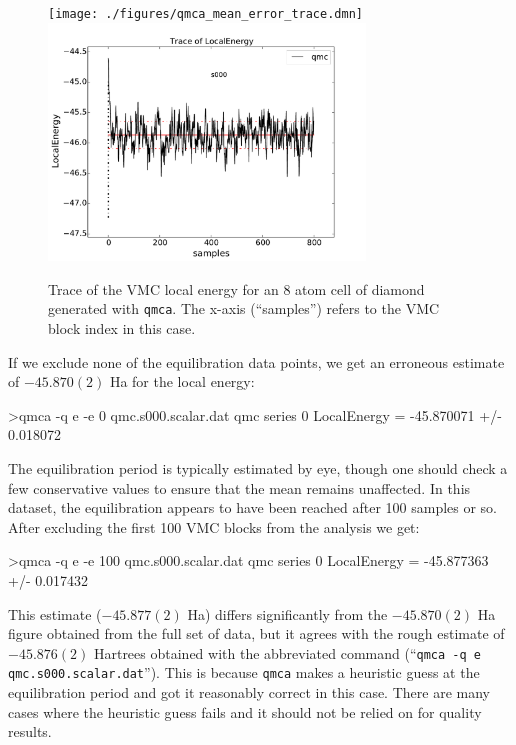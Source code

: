 \begin{figure}
\begin{center}
\ifdefined\HCode
\texttt{[image: ./figures/qmca\_mean\_error\_trace.dmn]}
\else
\includegraphics[trim = 0mm 0mm 0mm 0mm,clip,width=0.75\textwidth]{./figures/qmca_mean_error_trace.pdf}
\fi
\caption{Trace of the VMC local energy for an 8 atom cell of diamond generated with \texttt{qmca}.  The x-axis (``samples'') refers to the VMC block index in this case.}
\label{fig:qmca_mean_error_trace}
\end{center}
\end{figure}

If we exclude none of the equilibration data points, we get an 
erroneous estimate of $-45.870(2)$ Ha for the local energy:
\begin{shade}
>qmca -q e -e 0 qmc.s000.scalar.dat 
qmc  series 0  LocalEnergy           =  -45.870071 +/- 0.018072
\end{shade}
\noindent
The equilibration period is typically estimated by eye, though one should
check a few conservative values to ensure that the mean remains 
unaffected.  In this dataset, the equilibration appears to have been 
reached after 100 samples or so.  After excluding the first 100 
VMC blocks from the analysis we get:
\begin{shade}
>qmca -q e -e 100 qmc.s000.scalar.dat 
qmc  series 0  LocalEnergy           =  -45.877363 +/- 0.017432
\end{shade}
\noindent
This estimate ($-45.877(2)$ Ha) differs significantly from the 
$-45.870(2)$ Ha figure obtained from the full set of data, but it 
agrees with the rough estimate of $-45.876(2)$ Hartrees obtained 
with the abbreviated command (``\texttt{qmca -q e qmc.s000.scalar.dat}'').
This is because \texttt{qmca} makes a heuristic guess at the 
equilibration period and got it reasonably correct in this case. 
There are many cases where the heuristic guess fails and it should not 
be relied on for quality results.


